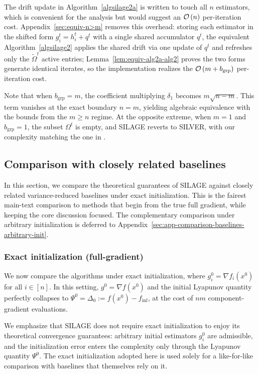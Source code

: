 \documentclass{article}
\newcommand{\cO}{{\cal O}}
\newcommand{\finf}{f_\mathrm{inf}}
\newcommand{\eqdef}{:=}
\newcommand{\rb}[1]{\left(#1\right)}
\theoremstyle{plain}
\newcommand{\algname}[1]{{\sf\scalefont{0.88}\color{mydarkgreen}#1}\xspace}
\newcommand{\algn}[1]{\algname{#1}}
\newcommand{\algno}{{\sf\scalefont{0.88}\color{mydarkgreen}SILAGE}\xspace}
\def\algname#1{#1}%
\begin{document}
The drift update in Algorithm~\ref{algsilage2a} is written to touch all $n$ estimators, which is convenient for the analysis but would suggest an $\cO\rb{n}$ per-iteration cost. Appendix~\ref{sec:equiv-n>m} removes this overhead: storing each estimator in the shifted form $g_i^t=h_i^t+q^t$ with a single shared accumulator $q^t$, the equivalent Algorithm~\ref{algsilage2} applies the shared drift via one update of $q^t$ and refreshes only the $\tilde{\Omega}^t$ active entries; Lemma~\ref{lem:equiv-alg2a-alg2} proves the two forms generate identical iterates, so the implementation realizes the $\cO\rb{m+b_{\mathrm{grp}}}$ per-iteration cost.

Note that when $b_{\mathrm{grp}}=m$, the coefficient multiplying $\delta_1$ becomes $m\sqrt{n-m}$. This term vanishes at the exact boundary $n=m$, yielding algebraic equivalence with the bounds from the $m \ge n$ regime. At the opposite extreme, when $m=1$ and $b_{\mathrm{grp}}=1$, the subset $\Omega^t$ is empty, and
\algno reverts to \algn{SILVER}, with our complexity matching the one in \citet{oko24}.

\subsection{Comparison with closely related baselines}
\label{sec:comparison_baselines}

In this section, we compare the theoretical guarantees of \algno against closely related variance-reduced baselines under exact initialization. This is the fairest main-text comparison to methods that begin from the true full gradient, while keeping the core discussion focused. The complementary comparison under arbitrary initialization is deferred to Appendix~\ref{sec:app-comparison-baselines-arbitrary-init}.

\subsubsection{Exact initialization (full-gradient)}\label{sec:comp-exact-init}

We now compare the algorithms under exact initialization, where $g_i^0=\nabla f_i(x^0)$ for all $i\in[n]$. In this setting, $g^0=\nabla f(x^0)$ and the initial Lyapunov quantity perfectly collapses to $\Psi^0=\Delta_0 \eqdef f(x^0)-\finf$, at the cost of $nm$ component-gradient evaluations.

We emphasize that \algname{SILAGE} does not require exact initialization to enjoy its theoretical convergence guarantees: arbitrary initial estimators $g_i^0$ are admissible, and the initialization error enters the complexity only through the Lyapunov quantity $\Psi^0$. The exact initialization adopted here is used solely for a like-for-like comparison with baselines that themselves rely on it.
\end{document}
